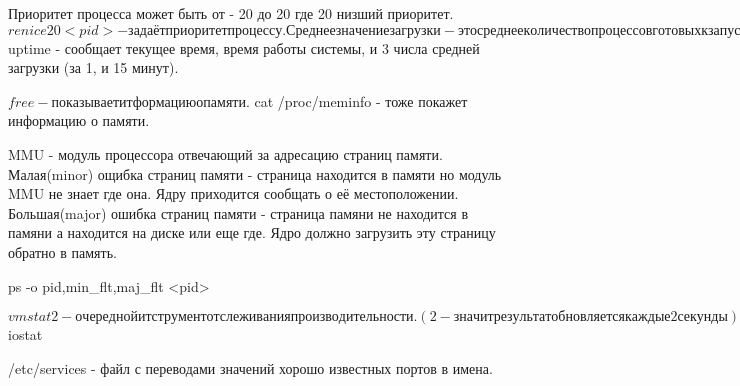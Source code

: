 Приоритет процесса может быть от - 20 до 20 где 20 низший приоритет.
$ renice 20 <pid> - задаёт приоритет процессу.
Среднее значение загрузки - это среднее количество процессов готовых к запуску 
                            (на исполнение для процесора).
$ uptime - сообщает текущее время, время работы системы, и 3 числа средней
загрузки (за 1, и 15 минут).

$ free - показывает итформацию о памяти.
$ cat /proc/meminfo - тоже покажет информацию о памяти.

MMU - модуль процессора отвечающий за адресацию страниц памяти.
    Малая(minor) ощибка страниц памяти - страница находится в памяти но модуль 
MMU не знает где она. Ядру приходится сообщать о её местоположении.
    Большая(major) ошибка страниц памяти - страница памяни не находится в памяни 
а находится на диске или еще где. Ядро должно загрузить эту страницу обратно в
память.

ps -o pid,min_flt,maj_flt <pid> 

$ vmstat 2 - очередной итструмент отслеживания производительности. (2 - значит
результат обновляется каждые 2 секунды).
Поля: %
proc:
 r - run
 b - blocked (запуск не разрешён)
memory:
 swpd - перемещено Kb на диск.
 free - свободно Kb памяти.
 buff - объём памяти для дисковых буферов.
swap:
 si - swap in.(не обязательно свап, может еще читать dll)
 so - swap out.
io:
 bi - blocks in
 bo - blocks out
system:
 in -
 cs -
cpu:
 us - %
 sy - %
 id - %
 wa - %

$ iostat

/etc/services - файл с переводами значений хорошо известных портов в имена.
